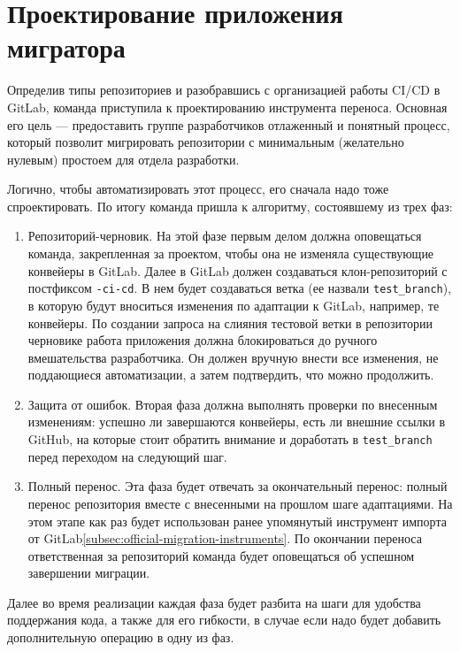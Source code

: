 \section{Проектирование приложения мигратора} \label{sec:gitlab-migrator-app}

Определив типы репозиториев и разобравшись с организацией работы CI/CD в GitLab, команда приступила к проектированию инструмента переноса.
Основная его цель — предоставить группе разработчиков отлаженный и понятный процесс,
который позволит мигрировать репозитории с минимальным (желательно нулевым) простоем для отдела разработки.

Логично, чтобы автоматизировать этот процесс, его сначала надо тоже спроектировать.
По итогу команда пришла к алгоритму, состоявшему из трех фаз:
\begin{enumerate}
  \item Репозиторий-черновик.
        На этой фазе первым делом должна оповещаться команда, закрепленная за проектом, чтобы она не изменяла существующие конвейеры в GitLab.
        Далее в GitLab должен создаваться клон-репозиторий с постфиксом \texttt{-ci-cd}.
        В нем будет создаваться ветка (ее назвали \texttt{test\_branch}), в которую будут вноситься изменения по адаптации к GitLab, например, те конвейеры.
        По создании запроса на слияния тестовой ветки в репозитории черновике работа приложения должна блокироваться до ручного вмешательства разработчика.
        Он должен вручную внести все изменения, не поддающиеся автоматизации, а затем подтвердить, что можно продолжить.
  \item Защита от ошибок.
        Вторая фаза должна выполнять проверки по внесенным изменениям: успешно ли завершаются конвейеры, есть ли внешние ссылки в GitHub,
        на которые стоит обратить внимание и доработать в \texttt{test\_branch} перед переходом на следующий шаг.
  \item Полный перенос.
        Эта фаза будет отвечать за окончательный перенос: полный перенос репозитория вместе с внесенными на прошлом шаге адаптациями.
        На этом этапе как раз будет использован ранее упомянутый инструмент импорта от GitLab\ref{subsec:official-migration-instruments}.
        По окончании переноса ответственная за репозиторий команда будет оповещаться об успешном завершении миграции.
\end{enumerate}

Далее во время реализации каждая фаза будет разбита на шаги для удобства поддержания кода, а также для его гибкости,
в случае если надо будет добавить дополнительную операцию в одну из фаз.

